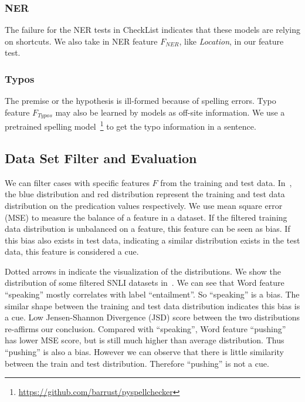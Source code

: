 \subsubsection{NER}
The failure for the NER tests in CheckList
indicates that these models are relying on shortcuts.
We also take in NER feature $F_{NER}$, like \textit{Location}, in our feature test.

\subsubsection{Typos}
The premise or the hypothesis is ill-formed because of spelling errors. 
Typo feature $F_{Typos}$ may also be learned by models as off-site information. 
We use a pretrained spelling model~\footnote{\url{https://github.com/barrust/pyspellchecker}} 
to get the typo information in a sentence. 


\subsection{Data Set Filter and Evaluation}
\label{sec:generate}
We can filter cases with specific features $F$ from the training and test data. 
In~, the blue 
distribution and red distribution represent  the training and test data 
distribution on the predication values respectively. 
We use mean square error (MSE) to measure the balance 
of a feature in a dataset. If the filtered training data distribution is 
unbalanced on a feature, this feature can be seen as bias.  
If this bias also exists in test data, indicating 
a similar distribution exists in the test data, 
this feature is considered a cue. 

Dotted arrows in  indicate the visualization of 
the distributions.
We show the distribution of some filtered SNLI datasets 
in~. 
We can see that Word feature ``speaking'' mostly correlates with 
label ``entailment''. So ``speaking'' is a bias. 
The similar shape between the training and test data distribution indicates 
this bias is a cue. Low Jensen-Shannon Divergence (JSD) score between the two
distributions re-affirms our conclusion. 
Compared with ``speaking'', Word feature ``pushing'' has lower MSE 
score, but is still much higher than average distribution.  
Thus ``pushing'' is also a bias. However we can observe that there is little similarity between 
the train and test distribution. Therefore ``pushing'' is not a cue.

